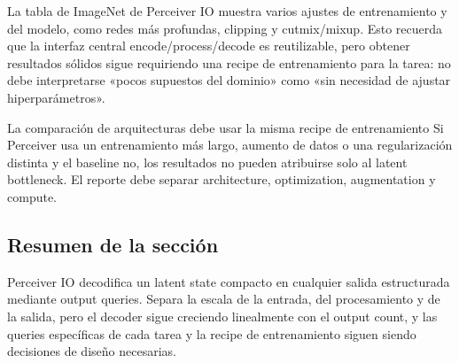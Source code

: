 La tabla de ImageNet de Perceiver IO muestra varios ajustes de entrenamiento y del modelo, como redes más profundas, clipping y cutmix/mixup. Esto recuerda que la interfaz central encode/process/decode es reutilizable, pero obtener resultados sólidos sigue requiriendo una recipe de entrenamiento para la tarea: no debe interpretarse «pocos supuestos del dominio» como «sin necesidad de ajustar hiperparámetros».


\begin{warningbox}{La comparación de arquitecturas debe usar la misma recipe de entrenamiento}
Si Perceiver usa un entrenamiento más largo, aumento de datos o una regularización distinta y el baseline no, los resultados no pueden atribuirse solo al latent bottleneck. El reporte debe separar architecture, optimization, augmentation y compute.
\end{warningbox}

\subsection{Resumen de la sección}

Perceiver IO decodifica un latent state compacto en cualquier salida estructurada mediante output queries. Separa la escala de la entrada, del procesamiento y de la salida, pero el decoder sigue creciendo linealmente con el output count, y las queries específicas de cada tarea y la recipe de entrenamiento siguen siendo decisiones de diseño necesarias.

